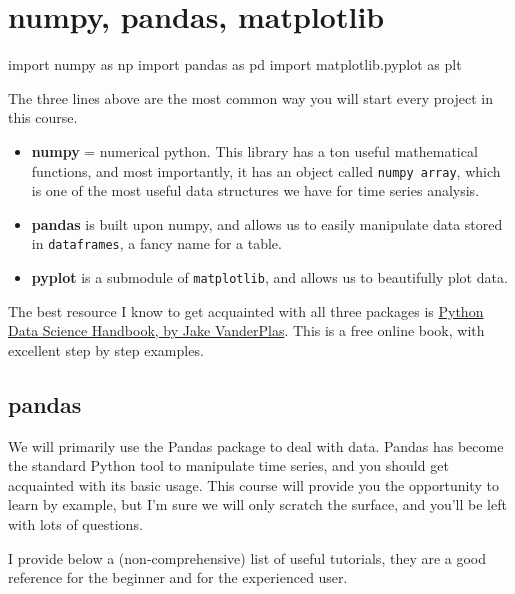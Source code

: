 \documentclass[
  letterpaper,
  DIV=11,
  numbers=noendperiod]{scrreprt}
\newenvironment{Shaded}{\begin{snugshade}}{\end{snugshade}}
\newcommand{\ImportTok}[1]{\textcolor[rgb]{0.00,0.46,0.62}{#1}}
\newcommand{\NormalTok}[1]{\textcolor[rgb]{0.00,0.23,0.31}{#1}}
\providecommand{\tightlist}{%
  \setlength{\itemsep}{0pt}\setlength{\parskip}{0pt}}\usepackage{longtable,booktabs,array}
\begin{document}
\chapter{numpy, pandas, matplotlib}\label{numpy-pandas-matplotlib}

\begin{Shaded}
\begin{Highlighting}[]
\ImportTok{import}\NormalTok{ numpy }\ImportTok{as}\NormalTok{ np}
\ImportTok{import}\NormalTok{ pandas }\ImportTok{as}\NormalTok{ pd}
\ImportTok{import}\NormalTok{ matplotlib.pyplot }\ImportTok{as}\NormalTok{ plt}
\end{Highlighting}
\end{Shaded}

The three lines above are the most common way you will start every
project in this course.

\begin{itemize}
\tightlist
\item
  \textbf{numpy} = numerical python. This library has a ton useful
  mathematical functions, and most importantly, it has an object called
  \texttt{numpy\ array}, which is one of the most useful data structures
  we have for time series analysis.
\item
  \textbf{pandas} is built upon numpy, and allows us to easily
  manipulate data stored in \texttt{dataframes}, a fancy name for a
  table.
\item
  \textbf{pyplot} is a submodule of \texttt{matplotlib}, and allows us
  to beautifully plot data.
\end{itemize}

The best resource I know to get acquainted with all three packages is
\href{https://jakevdp.github.io/PythonDataScienceHandbook/index.html}{Python
Data Science Handbook, by Jake VanderPlas}. This is a free online book,
with excellent step by step examples.

\section{pandas}\label{pandas}

We will primarily use the Pandas package to deal with data. Pandas has
become the standard Python tool to manipulate time series, and you
should get acquainted with its basic usage. This course will provide you
the opportunity to learn by example, but I'm sure we will only scratch
the surface, and you'll be left with lots of questions.

I provide below a (non-comprehensive) list of useful tutorials, they are
a good reference for the beginner and for the experienced user.
\end{document}
